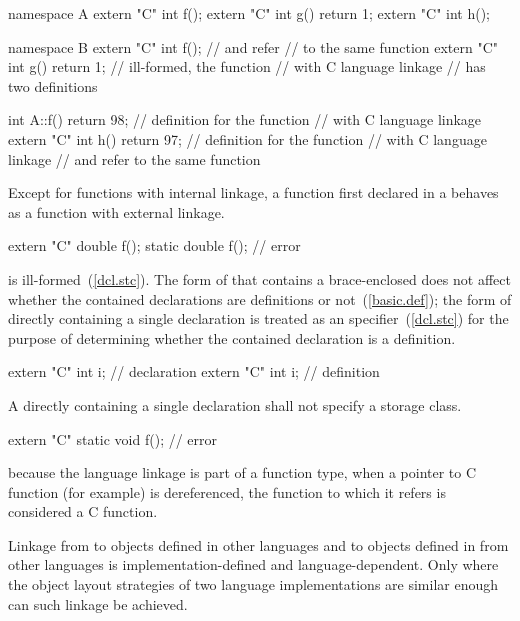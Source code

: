 \begin{codeblock}
namespace A {
    extern "C" int f();
    extern "C" int g() { return 1; }
    extern "C" int h();
}

namespace B {
    extern "C" int f();			//  and  refer
					// to the same function
    extern "C" int g() { return 1; }	// ill-formed, the function 
					// with C language linkage
					// has two definitions
}

int A::f() { return 98; }		// definition for the function 
					// with C language linkage
extern "C" int h() { return 97; }
					// definition for the function 
					// with C language linkage
					//  and  refer to the same function
\end{codeblock}
\exitnoteb

\pnum
Except for functions with internal linkage, a function first declared in a
 behaves as a function with external
linkage.
\enterexample

\begin{codeblock}
extern "C" double f();
static double f();              // error
\end{codeblock}

is ill-formed~(\ref{dcl.stc}).
\exitexample
The form of  that contains a
brace-enclosed  does not affect whether the
contained declarations are definitions or not~(\ref{basic.def}); the form
of  directly containing a single
declaration is treated as an  specifier~(\ref{dcl.stc}) for
the purpose of determining whether the contained declaration is a
definition.
\enterexample

\begin{codeblock}
extern "C" int i;		// declaration
extern "C" {
	int i;			// definition
}
\end{codeblock}

\exitexampleb
A  directly containing a single
declaration shall not specify a storage class.
\enterexample

\begin{codeblock}
extern "C" static void f();	// error
\end{codeblock}
\exitexampleb

\pnum
\enternote
because the language linkage is part of a function type, when a pointer to
C function (for example) is dereferenced, the function to which it refers is
considered a C function.
\exitnote

\pnum
{}%
%
Linkage from \Cpp to objects defined in other languages and to objects
defined in \Cpp from other languages is implemen\-tation-defined and
language-dependent. Only where the object layout strategies of two
language implementations are similar enough can such linkage be
achieved.%
